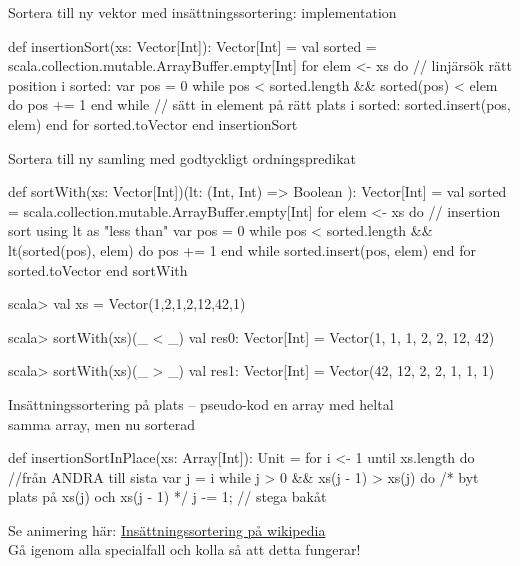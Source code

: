 \begin{Slide}{Sortera till ny vektor med insättningssortering: implementation} %
\begin{Code}
def insertionSort(xs: Vector[Int]): Vector[Int] = 
  val sorted = scala.collection.mutable.ArrayBuffer.empty[Int]
  for elem <- xs do
     // linjärsök rätt position i sorted:
     var pos = 0
     while pos < sorted.length && sorted(pos) < elem do
       pos += 1
     end while
     // sätt in element på rätt plats i sorted:
     sorted.insert(pos, elem)
  end for
  sorted.toVector
end insertionSort
\end{Code}
\end{Slide}

\begin{Slide}{Sortera till ny samling med godtyckligt ordningspredikat}
\begin{CodeSmall}
def sortWith(xs: Vector[Int])(lt: (Int, Int) => Boolean ): Vector[Int] = 
  val sorted = scala.collection.mutable.ArrayBuffer.empty[Int]
  for elem <- xs do  // insertion sort using lt as "less than"
     var pos = 0
     while pos < sorted.length && lt(sorted(pos), elem) do
       pos += 1
     end while
     sorted.insert(pos, elem)
  end for
  sorted.toVector
end sortWith
\end{CodeSmall}
\pause
\begin{REPL}
scala> val xs = Vector(1,2,1,2,12,42,1)

scala> sortWith(xs)(_ < _)
val res0: Vector[Int] = Vector(1, 1, 1, 2, 2, 12, 42)

scala> sortWith(xs)(_ > _)
val res1: Vector[Int] = Vector(42, 12, 2, 2, 1, 1, 1)
\end{REPL}
\end{Slide}


\begin{Slide}{Insättningssortering på plats -- pseudo-kod}
 en array med heltal\\
 samma array, men nu sorterad\\
\begin{Code}
def insertionSortInPlace(xs: Array[Int]): Unit = 
  for i <- 1 until xs.length do  //från ANDRA till sista
    var j = i
    while j > 0 && xs(j - 1) > xs(j) do
      /* byt plats på xs(j) och xs(j - 1) */
      j -= 1;  // stega bakåt
\end{Code}
\pause
Se animering här: \href{https://sv.wikipedia.org/wiki/Ins\%C3\%A4ttningssortering}{Insättningssortering på wikipedia}\\
Gå igenom alla specialfall och kolla så att detta fungerar!
\end{Slide}

